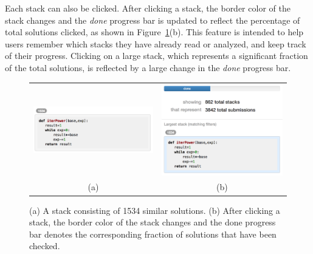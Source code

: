 Each stack can also be clicked. After clicking a stack, the border color of the stack changes and the \emph{done} progress bar is updated to reflect the percentage of total solutions clicked, as shown in Figure~\ref{stacks}(b). This feature is intended to help users remember which stacks they have already read or analyzed, and keep track of their progress. Clicking on a large stack, which represents a significant fraction of the total solutions, is reflected by a large change in the \emph{done} progress bar. 

\begin{figure}[htpb]
\begin{tabular}{c | c}
\begin{minipage}{.5\linewidth}
\centering
\includegraphics[width=0.95\linewidth]{Body/figures/overcode/stackScreenShot.png}
\end{minipage}
&
\begin{minipage}{.5\linewidth}
\centering
\includegraphics[width=0.95\linewidth]{Body/figures/overcode/checkDone.png}
\end{minipage}
\\
(a) & (b)
\end{tabular}
\caption{(a) A stack consisting of 1534 similar  solutions. (b) After clicking a stack, the border color of the stack changes and the done progress bar denotes the corresponding fraction of solutions that have been checked.}
\label{stacks}
\end{figure}

